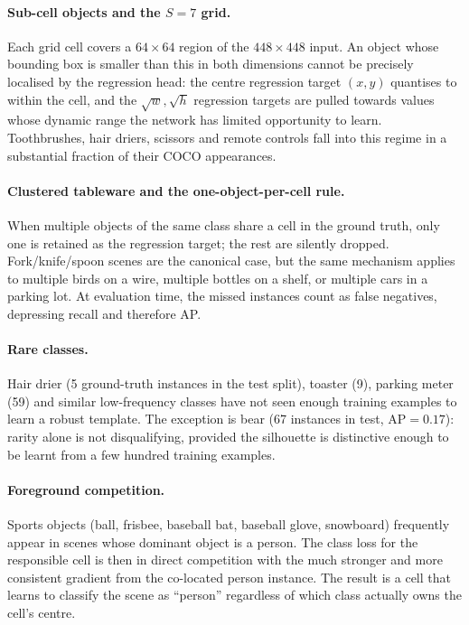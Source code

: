 \paragraph{Sub-cell objects and the $S=7$ grid.} Each grid cell covers a
$64\!\times\!64$ region of the $448\!\times\!448$ input. An object whose
bounding box is smaller than this in both dimensions cannot be precisely
localised by the regression head: the centre regression target $(x, y)$
quantises to within the cell, and the $\sqrt{w}, \sqrt{h}$ regression
targets are pulled towards values whose dynamic range the network has
limited opportunity to learn. Toothbrushes, hair driers, scissors and remote
controls fall into this regime in a substantial fraction of their COCO
appearances.

\paragraph{Clustered tableware and the one-object-per-cell rule.} When
multiple objects of the same class share a cell in the ground truth, only
one is retained as the regression target; the rest are silently dropped.
Fork/knife/spoon scenes are the canonical case, but the same mechanism
applies to multiple birds on a wire, multiple bottles on a shelf, or
multiple cars in a parking lot. At evaluation time, the missed instances
count as false negatives, depressing recall and therefore AP.

\paragraph{Rare classes.} Hair drier (5 ground-truth instances in the test
split), toaster (9), parking meter (59) and similar low-frequency classes
have not seen enough training examples to learn a robust template. The
exception is bear (67 instances in test, $\mathrm{AP}=0.17$): rarity alone
is not disqualifying, provided the silhouette is distinctive enough to be
learnt from a few hundred training examples.

\paragraph{Foreground competition.} Sports objects (ball, frisbee, baseball
bat, baseball glove, snowboard) frequently appear in scenes whose dominant
object is a person. The class loss for the responsible cell is then in
direct competition with the much stronger and more consistent gradient from
the co-located person instance. The result is a cell that learns to
classify the scene as ``person'' regardless of which class actually owns the
cell's centre.

